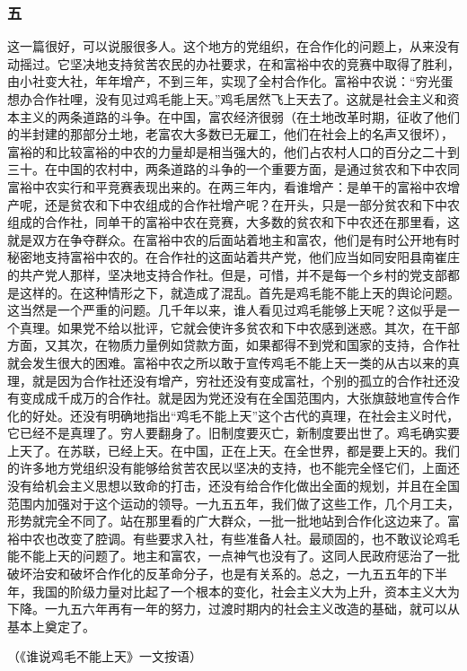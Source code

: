 \documentclass[cn,11pt,chinese]{elegantbook}
\def\myformat#1{\hfil\hfil #1}
\begin{document}
\subsubsection*{\myformat{五}}
这一篇很好，可以说服很多人。这个地方的党组织，在合作化的问题上，从来没有动摇过。它坚决地支持贫苦农民的办社要求，在和富裕中农的竞赛中取得了胜利，由小社变大社，年年增产，不到三年，实现了全村合作化。富裕中农说：“穷光蛋想办合作社哩，没有见过鸡毛能上天。”鸡毛居然飞上天去了。这就是社会主义和资本主义的两条道路的斗争。在中国，富农经济很弱（在土地改革时期，征收了他们的半封建的那部分土地，老富农大多数已无雇工，他们在社会上的名声又很坏），富裕的和比较富裕的中农的力量却是相当强大的，他们占农村人口的百分之二十到三十。在中国的农村中，两条道路的斗争的一个重要方面，是通过贫农和下中农同富裕中农实行和平竞赛表现出来的。在两三年内，看谁增产：是单干的富裕中农增产呢，还是贫农和下中农组成的合作社增产呢？在开头，只是一部分贫农和下中农组成的合作社，同单干的富裕中农在竞赛，大多数的贫农和下中农还在那里看，这就是双方在争夺群众。在富裕中农的后面站着地主和富农，他们是有时公开地有时秘密地支持富裕中农的。在合作社的这面站着共产党，他们应当如同安阳县南崔庄的共产党人那样，坚决地支持合作社。但是，可惜，并不是每一个乡村的党支部都是这样的。在这种情形之下，就造成了混乱。首先是鸡毛能不能上天的舆论问题。这当然是一个严重的问题。几千年以来，谁人看见过鸡毛能够上天呢？这似乎是一个真理。如果党不给以批评，它就会使许多贫农和下中农感到迷惑。其次，在干部方面，又其次，在物质力量例如贷款方面，如果都得不到党和国家的支持，合作社就会发生很大的困难。富裕中农之所以敢于宣传鸡毛不能上天一类的从古以来的真理，就是因为合作社还没有增产，穷社还没有变成富社，个别的孤立的合作社还没有变成成千成万的合作社。就是因为党还没有在全国范围内，大张旗鼓地宣传合作化的好处。还没有明确地指出“鸡毛不能上天”这个古代的真理，在社会主义时代，它已经不是真理了。穷人要翻身了。旧制度要灭亡，新制度要出世了。鸡毛确实要上天了。在苏联，已经上天。在中国，正在上天。在全世界，都是要上天的。我们的许多地方党组织没有能够给贫苦农民以坚决的支持，也不能完全怪它们，上面还没有给机会主义思想以致命的打击，还没有给合作化做出全面的规划，并且在全国范围内加强对于这个运动的领导。一九五五年，我们做了这些工作，几个月工夫，形势就完全不同了。站在那里看的广大群众，一批一批地站到合作化这边来了。富裕中农也改变了腔调。有些要求入社，有些准备人社。最顽固的，也不敢议论鸡毛能不能上天的问题了。地主和富农，一点神气也没有了。这同人民政府惩治了一批破坏治安和破坏合作化的反革命分子，也是有关系的。总之，一九五五年的下半年，我国的阶级力量对比起了一个根本的变化，社会主义大为上升，资本主义大为下降。一九五六年再有一年的努力，过渡时期内的社会主义改造的基础，就可以从基本上奠定了。\\
\begin{flushright}（《谁说鸡毛不能上天》一文按语）\end{flushright}
\end{document}
